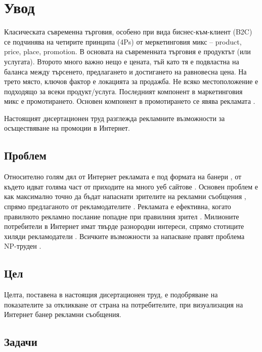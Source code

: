 \chapter*{Увод}

Класическата съвременна търговия, особено при вида биснес-към-клиент (B2C) се подчинява на четирите принципа (4Ps) от меркетинговия микс – product, price, place, promotion. В основата на съвременната търговия е продуктът (или услугата). Второто много важно нещо е цената, тъй като тя е подвластна на баланса между търсенето, предлагането и достигането на равновесна цена. На трето място, ключов фактор е локацията за продажба. Не всяко местоположение е подходящо за всеки продукт/услуга. Последният компонент в маркетинговия микс е промотирането. Основен компонент в промотирането се явява рекламата \cite{POCOL170134}. 

Настоящият дисертационен труд разглежда рекламните възможности за осъществяване на промоции в Интернет. 

\section*{Проблем}

Относително голям дял от Интернет рекламата е под формата на банери \cite{1597398, usmonova_dilfuza_ilkhomovna_usmanov_shak_2022_7110290}, от където идват голяма част от приходите на много уеб сайтове \cite{7325200}. Основен проблем е как максимално точно да бъдат напаснати зрителите на рекламни съобщения \cite{10.1145/2939672.2939724}, спрямо предлаганото от рекламодателите \cite{MIRALLESPECHUAN201839}. Рекламата е ефективна, когато правилното рекламно послание попадне при правилния зрител \cite{10.1145/2339530.2339655}. Милионите потребители в Интернет имат твърде разнородни интереси, спрямо стотиците хиляди рекламодатели \cite{10.1145/3097983.3098134}. Всичките възможности за напасване правят проблема NP-труден \cite{KIM2020106226}.

\section*{Цел}

Целта, поставена в настоящия дисертационен труд, е подобряване на показателите за откликване от страна на потребителите, при визуализация на Интернет банер рекламни съобщения. 

\section*{Задачи}

